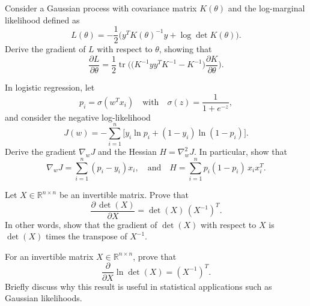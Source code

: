 \begin{exercise}
   Consider a Gaussian process with covariance matrix $K(\theta)$ and the log-marginal likelihood defined as
   \[
      L(\theta) = -\frac{1}{2}\Big(y^T K(\theta)^{-1} y + \log\det K(\theta)\Big).
   \]
   Derive the gradient of $L$ with respect to $\theta$, showing that
   \[
      \frac{\partial L}{\partial \theta} = \frac{1}{2}\operatorname{tr}\!\Big(\Big(K^{-1}yy^T K^{-1} - K^{-1}\Big)\frac{\partial K}{\partial \theta}\Big).
   \]
\end{exercise}

\begin{exercise}
   In logistic regression, let 
   \[
      p_i = \sigma(w^T x_i) \quad \text{with} \quad \sigma(z)=\frac{1}{1+e^{-z}},
   \]
   and consider the negative log-likelihood
   \[
      J(w) = -\sum_{i=1}^n \Big[y_i\ln p_i + (1-y_i)\ln(1-p_i)\Big].
   \]
   Derive the gradient $\nabla_w J$ and the Hessian $H = \nabla^2_w J$. In particular, show that
   \[
      \nabla_w J = \sum_{i=1}^n (p_i - y_i)x_i, \quad \text{and} \quad H = \sum_{i=1}^n p_i(1-p_i)\,x_i x_i^T.
   \]
\end{exercise}

\begin{exercise}
   Let $X \in \mathbb{R}^{n\times n}$ be an invertible matrix. Prove that
   \[
      \frac{\partial\,\det(X)}{\partial X} = \det(X)\,(X^{-1})^T.
   \]
   In other words, show that the gradient of $\det(X)$ with respect to $X$ is $\det(X)$ times the transpose of $X^{-1}$.
\end{exercise}

\begin{exercise}
   For an invertible matrix $X \in \mathbb{R}^{n\times n}$, prove that
   \[
      \frac{\partial}{\partial X}\ln\det(X) = (X^{-1})^T.
   \]
   Briefly discuss why this result is useful in statistical applications such as Gaussian likelihoods.
\end{exercise}

